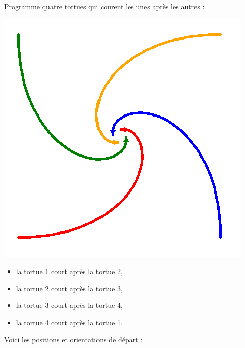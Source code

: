 \documentclass[11pt,class=report,crop=false]{standalone}
\begin{document}

\begin{activite}



Programme quatre tortues qui courent les unes après les autres :

\begin{center}
\includegraphics[scale=\myscale,scale=0.5]{ecran-tortue-6a}
\end{center}


\begin{itemize}
  \item la tortue 1 court après la tortue 2,
  \item la tortue 2 court après la tortue 3,
  \item la tortue 3 court après la tortue 4,
  \item la tortue 4 court après la tortue 1.
\end{itemize}

\bigskip

Voici les positions et orientations de départ :



\end{activite}
\end{document}
